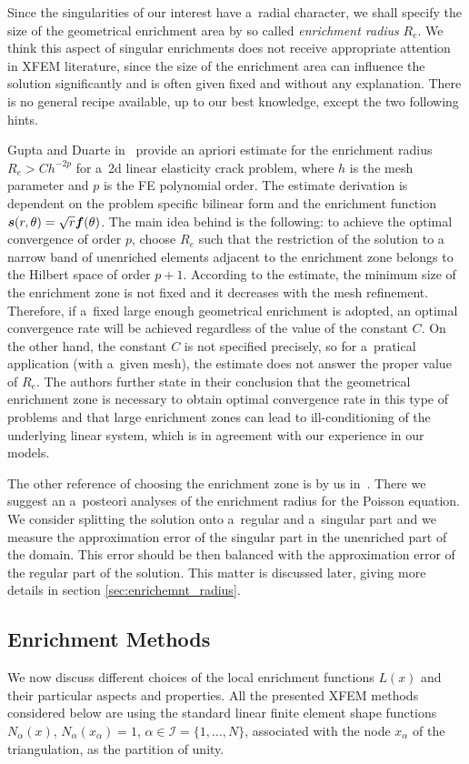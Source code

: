 Since the singularities of our interest have a~radial character, we shall specify the size of the geometrical enrichment area by so called \emph{enrichment radius} $R_e$.
We think this aspect of singular enrichments does not receive appropriate attention in XFEM literature, since the size of the enrichment area
can influence the solution significantly and is often given fixed and without any explanation.
There is no general recipe available, up to our best knowledge, except the two following hints.

Gupta and Duarte in~\cite{gupta_enr_zone_2016} provide an apriori estimate for the enrichment radius $R_e>Ch^{-2p}$ for a~2d linear elasticity crack problem,
where $h$ is the mesh parameter and $p$ is the FE polynomial order.
The estimate derivation is dependent on the problem specific bilinear form and the enrichment function $\mathbf{\boldsymbol{s}}(r,\theta) = \sqrt{r} \mathbf{\boldsymbol{f}}(\theta)$.
The main idea behind is the following: to achieve the optimal convergence of order $p$, choose $R_e$ such that the restriction of the solution to
a narrow band of unenriched elements adjacent to the enrichment zone belongs to the Hilbert space of order $p+1$.
According to the estimate, the minimum size of the enrichment zone is not fixed and it decreases with the mesh refinement.
Therefore, if a~fixed large enough geometrical enrichment is adopted, an optimal convergence rate will be achieved regardless of the value of the constant $C$.
On the other hand, the constant $C$ is not specified precisely, so for a~pratical application (with a~given mesh), the estimate does not answer the proper value of $R_e$.
The authors further state in their conclusion that the geometrical enrichment zone is necessary to obtain optimal convergence rate in this type of problems
and that large enrichment zones can lead to ill-conditioning of the underlying linear system, which is in agreement with our experience in our models.

The other reference of choosing the enrichment zone is by us in~\cite{exner_2016}.
There we suggest an a~posteori analyses of the enrichment radius for the Poisson equation.
We consider splitting the solution onto a~regular and a~singular part and we measure the approximation error of the singular part
in the unenriched part of the domain. This error should be then balanced with the approximation error of the regular part of the solution.
This matter is discussed later, giving more details in section \ref{sec:enrichemnt_radius}.

 
\subsection{Enrichment Methods} \label{sec:enrichment_methods}
We now discuss different choices of the local enrichment functions $L(x)$ and their particular aspects and properties.
All the presented XFEM methods considered below are using the standard linear finite element shape 
functions $N_\alpha(x)$, $N_\alpha(x_\alpha)=1$, $\alpha\in\mathcal{I}=\{1,\ldots,N\}$, associated with the node $x_\alpha$ of the triangulation,
as the partition of unity.


